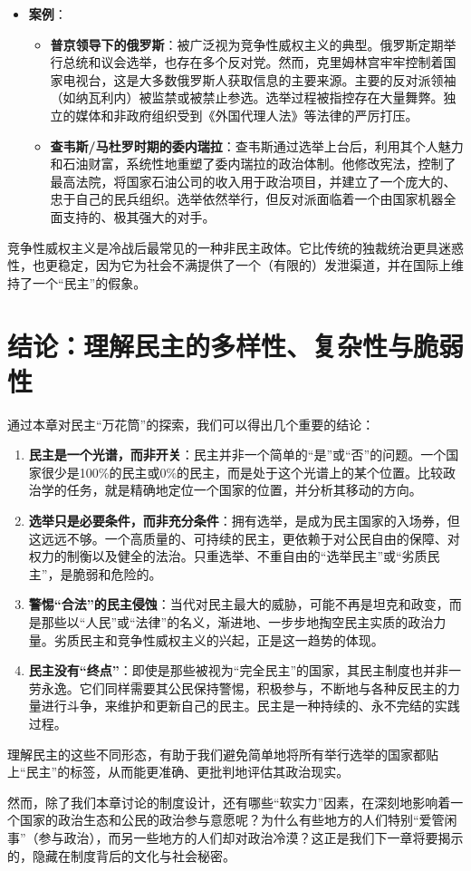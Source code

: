 \begin{itemize}
    \item \textbf{案例}：
    \begin{itemize}
        \item \textbf{普京领导下的俄罗斯}：被广泛视为竞争性威权主义的典型。俄罗斯定期举行总统和议会选举，也存在多个反对党。然而，克里姆林宫牢牢控制着国家电视台，这是大多数俄罗斯人获取信息的主要来源。主要的反对派领袖（如纳瓦利内）被监禁或被禁止参选。选举过程被指控存在大量舞弊。独立的媒体和非政府组织受到《外国代理人法》等法律的严厉打压。
        \item \textbf{查韦斯/马杜罗时期的委内瑞拉}：查韦斯通过选举上台后，利用其个人魅力和石油财富，系统性地重塑了委内瑞拉的政治体制。他修改宪法，控制了最高法院，将国家石油公司的收入用于政治项目，并建立了一个庞大的、忠于自己的民兵组织。选举依然举行，但反对派面临着一个由国家机器全面支持的、极其强大的对手。
    \end{itemize}
\end{itemize}

竞争性威权主义是冷战后最常见的一种非民主政体。它比传统的独裁统治更具迷惑性，也更稳定，因为它为社会不满提供了一个（有限的）发泄渠道，并在国际上维持了一个“民主”的假象。

\hrulefill

\section*{结论：理解民主的多样性、复杂性与脆弱性}

通过本章对民主“万花筒”的探索，我们可以得出几个重要的结论：

\begin{enumerate}
    \item \textbf{民主是一个光谱，而非开关}：民主并非一个简单的“是”或“否”的问题。一个国家很少是100\%的民主或0\%的民主，而是处于这个光谱上的某个位置。比较政治学的任务，就是精确地定位一个国家的位置，并分析其移动的方向。
    \item \textbf{选举只是必要条件，而非充分条件}：拥有选举，是成为民主国家的入场券，但这远远不够。一个高质量的、可持续的民主，更依赖于对公民自由的保障、对权力的制衡以及健全的法治。只重选举、不重自由的“选举民主”或“劣质民主”，是脆弱和危险的。
    \item \textbf{警惕“合法”的民主侵蚀}：当代对民主最大的威胁，可能不再是坦克和政变，而是那些以“人民”或“法律”的名义，渐进地、一步步地掏空民主实质的政治力量。劣质民主和竞争性威权主义的兴起，正是这一趋势的体现。
    \item \textbf{民主没有“终点”}：即使是那些被视为“完全民主”的国家，其民主制度也并非一劳永逸。它们同样需要其公民保持警惕，积极参与，不断地与各种反民主的力量进行斗争，来维护和更新自己的民主。民主是一种持续的、永不完结的实践过程。
\end{enumerate}

理解民主的这些不同形态，有助于我们避免简单地将所有举行选举的国家都贴上“民主”的标签，从而能更准确、更批判地评估其政治现实。

然而，除了我们本章讨论的制度设计，还有哪些“软实力”因素，在深刻地影响着一个国家的政治生态和公民的政治参与意愿呢？为什么有些地方的人们特别“爱管闲事”（参与政治），而另一些地方的人们却对政治冷漠？这正是我们下一章将要揭示的，隐藏在制度背后的文化与社会秘密。

